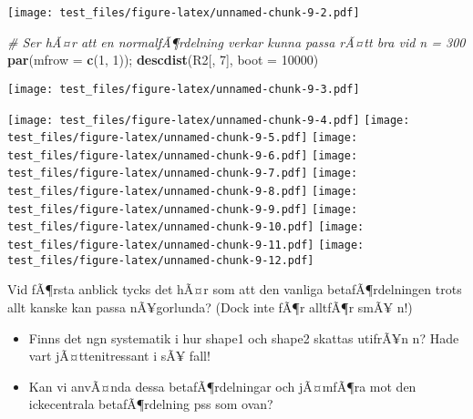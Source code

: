 \documentclass[]{article}
\newenvironment{Shaded}{\begin{snugshade}}{\end{snugshade}}
\newcommand{\KeywordTok}[1]{\textcolor[rgb]{0.13,0.29,0.53}{\textbf{{#1}}}}
\newcommand{\DataTypeTok}[1]{\textcolor[rgb]{0.13,0.29,0.53}{{#1}}}
\newcommand{\DecValTok}[1]{\textcolor[rgb]{0.00,0.00,0.81}{{#1}}}
\newcommand{\StringTok}[1]{\textcolor[rgb]{0.31,0.60,0.02}{{#1}}}
\newcommand{\CommentTok}[1]{\textcolor[rgb]{0.56,0.35,0.01}{\textit{{#1}}}}
\newcommand{\NormalTok}[1]{{#1}}
\providecommand{\tightlist}{%
  \setlength{\itemsep}{0pt}\setlength{\parskip}{0pt}}
\begin{document}
\texttt{[image: test\_files/figure-latex/unnamed-chunk-9-2.pdf]}

\begin{Shaded}
\begin{Highlighting}[]
\CommentTok{# Ser hÃ¤r att en normalfÃ¶rdelning verkar kunna passa rÃ¤tt bra vid n = 300}
\KeywordTok{par}\NormalTok{(}\DataTypeTok{mfrow =} \KeywordTok{c}\NormalTok{(}\DecValTok{1}\NormalTok{, }\DecValTok{1}\NormalTok{)); }\KeywordTok{descdist}\NormalTok{(R2[, }\DecValTok{7}\NormalTok{], }\DataTypeTok{boot =} \DecValTok{10000}\NormalTok{)}
\end{Highlighting}
\end{Shaded}

\texttt{[image: test\_files/figure-latex/unnamed-chunk-9-3.pdf]}

\begin{Shaded}
\end{Shaded}

\texttt{[image: test\_files/figure-latex/unnamed-chunk-9-4.pdf]}
\texttt{[image: test\_files/figure-latex/unnamed-chunk-9-5.pdf]}
\texttt{[image: test\_files/figure-latex/unnamed-chunk-9-6.pdf]}
\texttt{[image: test\_files/figure-latex/unnamed-chunk-9-7.pdf]}
\texttt{[image: test\_files/figure-latex/unnamed-chunk-9-8.pdf]}
\texttt{[image: test\_files/figure-latex/unnamed-chunk-9-9.pdf]}
\texttt{[image: test\_files/figure-latex/unnamed-chunk-9-10.pdf]}
\texttt{[image: test\_files/figure-latex/unnamed-chunk-9-11.pdf]}
\texttt{[image: test\_files/figure-latex/unnamed-chunk-9-12.pdf]}

Vid fÃ¶rsta anblick tycks det hÃ¤r som att den vanliga betafÃ¶rdelningen
trots allt kanske kan passa nÃ¥gorlunda? (Dock inte fÃ¶r alltfÃ¶r smÃ¥
n!)

\begin{itemize}
\tightlist
\item
  Finns det ngn systematik i hur shape1 och shape2 skattas utifrÃ¥n n?
  Hade vart jÃ¤ttenitressant i sÃ¥ fall!
\item
  Kan vi anvÃ¤nda dessa betafÃ¶rdelningar och jÃ¤mfÃ¶ra mot den
  ickecentrala betafÃ¶rdelning pss som ovan?
\end{itemize}
\end{document}
